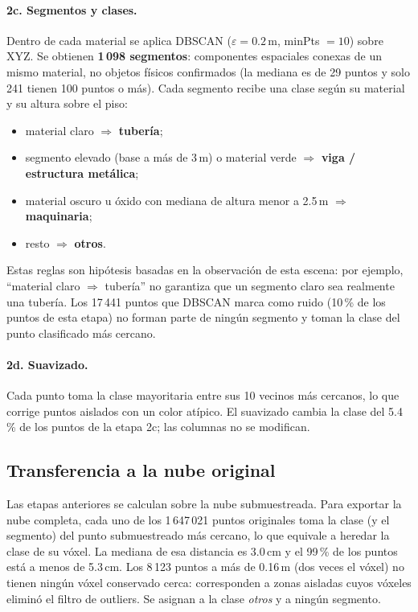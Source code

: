 \documentclass[11pt,a4paper]{article}
\begin{document}
\paragraph{2c. Segmentos y clases.} Dentro de cada material se aplica DBSCAN
($\varepsilon = 0.2$\,m, minPts $= 10$) sobre XYZ. Se obtienen
\textbf{1\,098 segmentos}: componentes espaciales conexas de un mismo
material, no objetos físicos confirmados (la mediana es de 29 puntos y solo 241
tienen 100 puntos o más). Cada segmento recibe una clase según su material y
su altura sobre el piso:
\begin{itemize}
  \item material claro $\Rightarrow$ \textbf{tubería};
  \item segmento elevado (base a más de 3\,m) o material verde $\Rightarrow$
        \textbf{viga / estructura metálica};
  \item material oscuro u óxido con mediana de altura menor a 2.5\,m
        $\Rightarrow$ \textbf{maquinaria};
  \item resto $\Rightarrow$ \textbf{otros}.
\end{itemize}
Estas reglas son hipótesis basadas en la observación de esta escena: por
ejemplo, ``material claro $\Rightarrow$ tubería'' no garantiza que un segmento
claro sea realmente una tubería. Los 17\,441 puntos que DBSCAN marca como
ruido (10\,\% de los puntos de esta etapa) no forman parte de ningún segmento y
toman la clase del punto clasificado más cercano.

\paragraph{2d. Suavizado.} Cada punto toma la clase mayoritaria entre sus 10
vecinos más cercanos, lo que corrige puntos aislados con un color atípico. El
suavizado cambia la clase del 5.4\,\% de los puntos de la etapa 2c; las columnas
no se modifican.

\subsection{Transferencia a la nube original}

Las etapas anteriores se calculan sobre la nube submuestreada. Para exportar la
nube completa, cada uno de los 1\,647\,021 puntos originales toma la clase (y el
segmento) del punto submuestreado más cercano, lo que equivale a heredar la
clase de su vóxel. La mediana de esa distancia es 3.0\,cm y el 99\,\% de los
puntos está a menos de 5.3\,cm. Los 8\,123 puntos a más de 0.16\,m (dos veces
el vóxel) no tienen ningún vóxel conservado cerca: corresponden a zonas
aisladas cuyos vóxeles eliminó el filtro de outliers. Se asignan a la clase
\emph{otros} y a ningún segmento.
\end{document}

